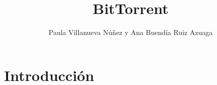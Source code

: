 \documentclass{article}
\begin{document}
\title{\Huge BitTorrent}
\author{Paula Villanueva Núñez y Ana Buendía Ruiz Azuaga}
\date{}
\maketitle

\tableofcontents
\newpage

\section{Introducción}
\end{document}
